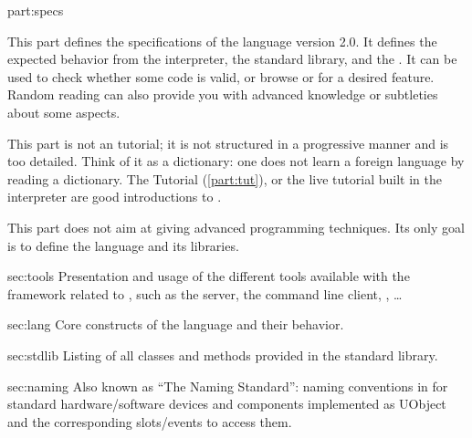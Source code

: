 \begin{partDescription}{part:specs}
  {
    This part defines the specifications of the \us language version
    2.0. It defines the expected behavior from the \us interpreter,
    the standard library, and the \sdk. It can be used to check
    whether some code is valid, or browse \us or \Cxx \api for a
    desired feature. Random reading can also provide you with advanced
    knowledge or subtleties about some \us aspects.

    This part is not an \us tutorial; it is not structured in a
    progressive manner and is too detailed.  Think of it as a
    dictionary: one does not learn a foreign language by reading a
    dictionary. The \us Tutorial (\autoref{part:tut}), or the live \us
    tutorial built in the interpreter are good introductions to \us.

    This part does not aim at giving advanced programming
    techniques. Its only goal is to define the language and its
    libraries.
  }
\item[sec:tools]
  Presentation and usage of the different tools available with the
  \urbi framework related to \us, such as the \urbi server, the
  command line client, \umake, \ldots

\item[sec:lang]
  Core constructs of the language and their behavior.

\item[sec:stdlib]
  Listing of all classes and methods provided in the standard library.

\item[sec:naming]
  Also known as ``The \urbi Naming Standard'': naming conventions in
  for standard hardware/software devices and components implemented as
  UObject and the corresponding slots/events to access them.

\end{partDescription}


